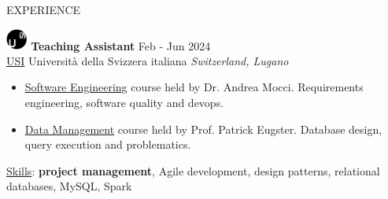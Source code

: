\documentclass{cv} %
\def\intraexpvspace{0.15cm}
\def\titlelistvspace{-0.15cm}
\begin{document}
\vspace{-0.2cm}
\begin{rSection}{EXPERIENCE}


    \includegraphics[width=0.7cm, trim={0cm 10cm 0cm 0cm}]{usi-icon.png}
    \hspace*{0cm}\textbf{Teaching Assistant} \hfill Feb - Jun 2024\\
    \hspace*{0.85cm}\href{https://www.usi.ch/}{USI} Università della Svizzera italiana
    \hfill \textit{Switzerland, Lugano}
    \vspace{\titlelistvspace}\begin{itemize}
        \itemsep -3pt {}
        \item \href{https://search.usi.ch/it/corsi/35268192/software-atelier-4-software-engineering-project}{Software Engineering}
              course held by Dr. Andrea Mocci. Requirements engineering, software quality and devops.

        \item \href{https://search.usi.ch/it/corsi/35268184/data-management}{Data Management}
              course held by Prof. Patrick Eugster. Database design, query execution and problematics.
    \end{itemize}
    \vspace*{-0.1cm}\hspace*{0.5cm}\underline{Skills}: \textbf{project management}, Agile development, design patterns, relational databases, MySQL, Spark
    \vspace{\intraexpvspace}


\end{rSection}
\end{document}
